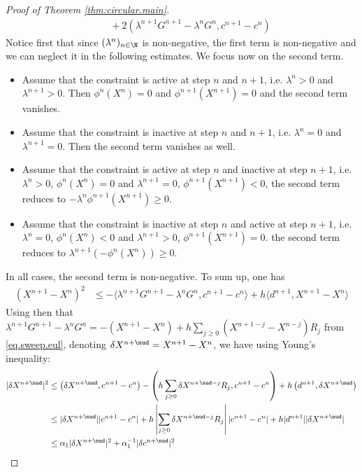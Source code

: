 \documentclass[]{jnsao}
\renewcommand{\tr}{R}
\begin{document}
\begin{proof}[Proof of Theorem \ref{thm:circular.main}]
$$\begin{aligned}
 		& \quad +
 		2\left(\lambda^{n+1}  G^{n+1} - \lambda^n G^n, c^{n+1}-c^n \right)
 	\end{aligned}		
 	$$
 	Notice first that since $(\lambda^n)_{n\in \N}$ is non-negative, the first term is non-negative and we can neglect it in the following estimates. 
 	We focus now on the second term. 
 	\begin{itemize}[itemsep=0.05cm,parsep=0.1cm]
 		\item Assume that the constraint is active at step $n$ and $n+1$, i.e. $\lambda^n >0$ and $\lambda^{n+1} >0$. 
 		Then $\phi^n(X^n) = 0$ and $\phi^{n+1}(X^{n+1})= 0$ and the second term vanishes.
 		\item Assume that the constraint is inactive at step $n$ and $n+1$, i.e. $\lambda^n =0$ and $\lambda^{n+1} =0$. 
 		Then the second term vanishes as well.
 		\item Assume that the constraint is active at step $n$ and inactive at step $n+1$, i.e. 
 		$\lambda^n >0$, $\phi^n(X^n) = 0$	 and $\lambda^{n+1} =0$, $\phi^{n+1}(X^{n+1}) < 0$, 
 		the second term reduces to $-\lambda^n \phi^{n+1}(X^{n+1}) \geq 0$.
 		\item Assume that the constraint is inactive at step $n$ and active at step $n+1$, i.e. 
 		$\lambda^n =0$, $\phi^n(X^n) < 0$ and $\lambda^{n+1} >0$, $\phi^{n+1}(X^{n+1}) = 0$. 
 		the second term reduces to $\lambda^{n+1} (-\phi^n(X^n)) \geq 0$.
 	\end{itemize}
 	In all cases, the second term is non-negative.
 	To sum up, one has
 	$$
 	\begin{aligned}
 		(X^{n+1}-X^n)^2 & \leq - \langle \lambda^{n+1} G^{n+1} - \lambda^n G^n, c^{n+1}-c^n \rangle 
 		+  h \langle d^{n+1}, X^{n+1}-X^n \rangle
 	\end{aligned}	
 	$$
 	Using then that $\lambda^{n+1} G^{n+1} - \lambda^n G^n = - (X^{n+1}-X^n) + h \sum_{j\geq 0} (X^{n+1-j}-X^{n-j}) \tr_j$
 	from \eqref{eq.sweep.eul}, 
 	denoting $\delta X^{n+\nud} = X^{n+1}-X^n$, we have	using Young's inequality:
 	$$
 	\begin{aligned}			
 		|\delta X^{n+\nud}|^2 & \leq \left( \delta X^{n+\nud}, c^{n+1}-c^n \right) 
 		- \left( h \sum_{j\geq 0} \delta {X}^{n+\nud-j} \tr_j, c^{n+1}-c^n \right) 
		+ h \left( d^{n+1}, \delta X^{n+\nud} \right) \\
 		& \leq |\delta X^{n+\nud}| |c^{n+1}-c^n| 
		+ h \left|\sum_{j\geq 0} \delta {X}^{n+\nud-j} \tr_j\right| |c^{n+1}-c^n| 
 		+  h |d^{n+1}| |\delta X^{n+\nud}| \\
 		& \leq \alpha_1 |\delta X^{n+\nud}|^2 + \alpha_1^{-1} |\delta c^{n+\nud}|^2 

\end{aligned}$$
\end{proof}
\end{document}
